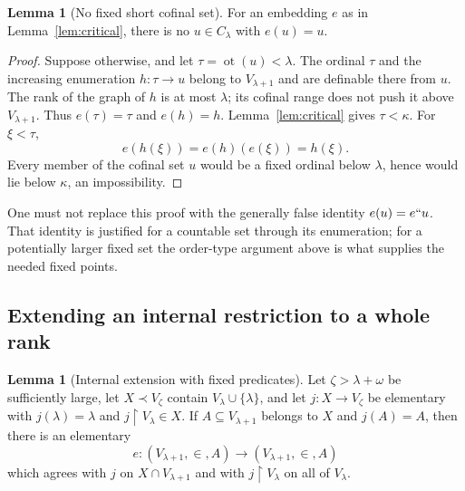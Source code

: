 \documentclass[11pt,letterpaper]{article}
\theoremstyle{definition}
\newtheorem{lemma}[definition]{Lemma}
\numberwithin{equation}{section}
\newcommand{\ot}{\operatorname{ot}}
\newcommand{\restr}{\mathbin{\upharpoonright}}
\newcommand{\Clam}{C_\lambda}
\begin{document}
\begin{lemma}[No fixed short cofinal set]\label{lem:no-fixed}
For an embedding $e$ as in Lemma~\ref{lem:critical}, there is no $u\in\Clam$ with $e(u)=u$.
\end{lemma}

\begin{proof}
Suppose otherwise, and let $\tau=\ot(u)<\lambda$. The ordinal $\tau$ and the increasing enumeration $h:\tau\to u$ belong to $V_{\lambda+1}$ and are definable there from $u$. The rank of the graph of $h$ is at most $\lambda$; its cofinal range does not push it above $V_{\lambda+1}$. Thus $e(\tau)=\tau$ and $e(h)=h$. Lemma~\ref{lem:critical} gives $\tau<\kappa$. For $\xi<\tau$,
\[
e(h(\xi))=e(h)(e(\xi))=h(\xi).
\]
Every member of the cofinal set $u$ would be a fixed ordinal below $\lambda$, hence would lie below $\kappa$, an impossibility.
\end{proof}

One must not replace this proof with the generally false identity $e(u)=e``u$. That identity is justified for a countable set through its enumeration; for a potentially larger fixed set the order-type argument above is what supplies the needed fixed points.

\subsection{Extending an internal restriction to a whole rank}

\begin{lemma}[Internal extension with fixed predicates]\label{lem:extension}
Let $\zeta>\lambda+\omega$ be sufficiently large, let $X\prec V_\zeta$ contain $V_\lambda\cup\{\lambda\}$, and let $j:X\to V_\zeta$ be elementary with $j(\lambda)=\lambda$ and $j\restr V_\lambda\in X$. If $A\subseteq V_{\lambda+1}$ belongs to $X$ and $j(A)=A$, then there is an elementary
\[
e:(V_{\lambda+1},\in,A)\longrightarrow(V_{\lambda+1},\in,A)
\]
which agrees with $j$ on $X\cap V_{\lambda+1}$ and with $j\restr V_\lambda$ on all of $V_\lambda$.
\end{lemma}
\end{document}
